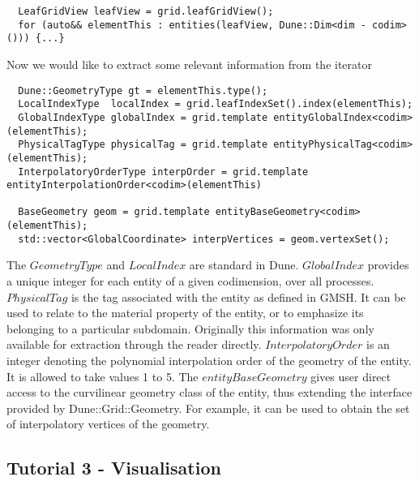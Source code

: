 \begin{mybox}
\begin{lstlisting}
  LeafGridView leafView = grid.leafGridView();
  for (auto&& elementThis : entities(leafView, Dune::Dim<dim - codim>())) {...}
\end{lstlisting}
\end{mybox}


Now we would like to extract some relevant information from the iterator \\
\begin{mybox}
\begin{lstlisting}
  Dune::GeometryType gt = elementThis.type();
  LocalIndexType  localIndex = grid.leafIndexSet().index(elementThis);
  GlobalIndexType globalIndex = grid.template entityGlobalIndex<codim>(elementThis);
  PhysicalTagType physicalTag = grid.template entityPhysicalTag<codim>(elementThis);
  InterpolatoryOrderType interpOrder = grid.template entityInterpolationOrder<codim>(elementThis)
	
  BaseGeometry geom = grid.template entityBaseGeometry<codim>(elementThis);
  std::vector<GlobalCoordinate> interpVertices = geom.vertexSet();
\end{lstlisting}
\end{mybox}

\noindent
The $GeometryType$ and $LocalIndex$ are standard in Dune. $GlobalIndex$ provides a unique integer for each entity of a given codimension, over all processes. $PhysicalTag$ is the tag associated with the entity as defined in GMSH. It can be used to relate to the material property of the entity, or to emphasize its belonging to a particular subdomain. Originally this information was only available for extraction through the reader directly. $InterpolatoryOrder$ is an integer denoting the polynomial interpolation order of the geometry of the entity. It is allowed to take values 1 to 5. The $entityBaseGeometry$ gives user direct access to the curvilinear geometry class of the entity, thus extending the interface provided by Dune::Grid::Geometry. For example, it can be used to obtain the set of interpolatory vertices of the geometry. \\






\subsection{Tutorial 3 - Visualisation}
\label{usage-howto-tutorial-visualisation}

